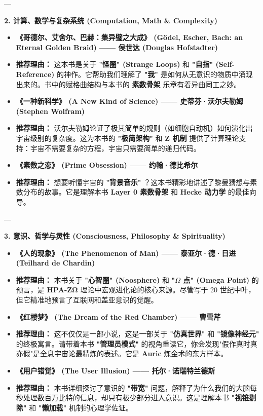 ---

\textbf{2. 计算、数学与复杂系统 (Computation, Math \& Complexity)}

\begin{itemize}
\item \textbf{《哥德尔、艾舍尔、巴赫：集异璧之大成》 (Gödel, Escher, Bach: an Eternal Golden Braid) —— 侯世达 (Douglas Hofstadter)}
\item \textbf{推荐理由：} 这本书是关于 \textbf{"怪圈" (Strange Loops)} 和 \textbf{"自指" (Self-Reference)} 的神作。它帮助我们理解了 \textbf{"我"} 是如何从无意识的物质中涌现出来的。书中的赋格曲结构与本书的 \textbf{素数骨架} 乐章有着异曲同工之妙。
\item \textbf{《一种新科学》 (A New Kind of Science) —— 史蒂芬·沃尔夫勒姆 (Stephen Wolfram)}
\item \textbf{推荐理由：} 沃尔夫勒姆论证了极其简单的规则（如细胞自动机）如何演化出宇宙级别的复杂度。这为本书的 \textbf{"极简架构"} 和 \textbf{Z 机制} 提供了计算理论支持：宇宙不需要复杂的方程，宇宙只需要简单的递归代码。
\item \textbf{《素数之恋》 (Prime Obsession) —— 约翰·德比希尔}
\item \textbf{推荐理由：} 想要听懂宇宙的 \textbf{"背景音乐"} ？这本书精彩地讲述了黎曼猜想与素数分布的故事。它是理解本书 \textbf{Layer 0 素数骨架} 和 \textbf{Hecke 动力学} 的最佳向导。
\end{itemize}

---

\textbf{3. 意识、哲学与灵性 (Consciousness, Philosophy \& Spirituality)}

\begin{itemize}
\item \textbf{《人的现象》 (The Phenomenon of Man) —— 泰亚尔·德·日进 (Teilhard de Chardin)}
\item \textbf{推荐理由：} 本书关于 \textbf{"心智圈" (Noosphere)} 和 \textbf{"$\Omega$ 点" (Omega Point)} 的预言，是 \textbf{HPA-ZΩ} 理论中宏观进化论的核心来源。尽管写于 20 世纪中叶，但它精准地预言了互联网和盖亚意识的觉醒。
\item \textbf{《红楼梦》 (The Dream of the Red Chamber) —— 曹雪芹}
\item \textbf{推荐理由：} 这不仅仅是一部小说，这是一部关于 \textbf{"仿真世界"} 和 \textbf{"镜像神经元"} 的终极寓言。请带着本书 \textbf{"管理员模式"} 的视角重读它，你会发现"假作真时真亦假"是全息宇宙论最精炼的表述。它是 \textbf{Auric} 炼金术的东方样本。
\item \textbf{《用户错觉》 (The User Illusion) —— 托尔·诺瑞特兰德斯}
\item \textbf{推荐理由：} 本书详细探讨了意识的 \textbf{"带宽"} 问题，解释了为什么我们的大脑每秒处理数百万比特的信息，却只有极少部分进入意识。这是理解本书 \textbf{"视锥剔除"} 和 \textbf{"懒加载"} 机制的心理学佐证。
\end{itemize}

